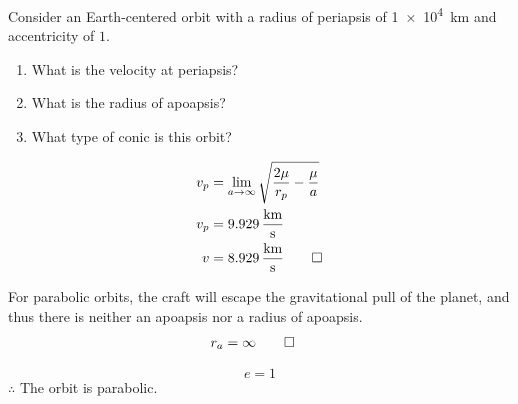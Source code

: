 \begin{hwkProblem}{5}{}
	
	Consider an Earth-centered orbit with a radius of periapsis of \qty{1e4}{\km} and accentricity of \( 1 \).
	\begin{enumerate}
		\item What is the velocity at periapsis?
		\item What is the radius of apoapsis?
		\item What type of conic is this orbit?
	\end{enumerate}
	
	\hwkSol

	\hwkPart
	\begin{align*}
		v_p & = \lim_{a \to \infty} \sqrt{\frac{2\mu}{r_p} - \frac{\mu}{a}} \\
		v_p & = \qty{9.929}{\km\per\s} \\
		v & = \qty{8.929}{\km\per\s} \qed
	\end{align*}

	\hwkPart

	For parabolic orbits, the craft will escape the gravitational pull of the planet, and thus there is neither an apoapsis nor a radius of apoapsis.
	\begin{align*}
		r_a & = \infty \qed
	\end{align*}

	\hwkPart
	\[
		e = 1
	\]
	\( \therefore \) The orbit is parabolic.
	
\end{hwkProblem}


